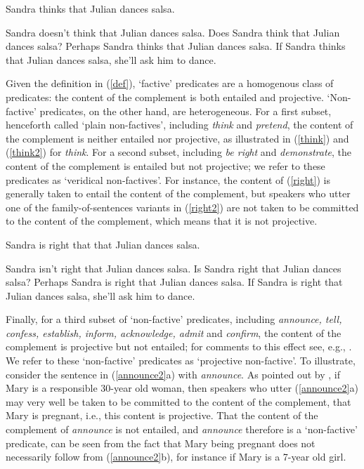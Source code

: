 \documentclass[11pt,fleqn]{article}
\newcommand{\6}{\mbox{$[\hspace*{-.6mm}[$}}
\newcommand{\9}{\mbox{$]\hspace*{-.6mm}]$}}
\begin{document}
\begin{exe}

\ex\label{think} Sandra thinks that Julian dances salsa.
\ex\label{think2} 

\begin{xlist} 
\ex Sandra doesn't think that Julian dances salsa. 
\ex Does Sandra think that Julian dances salsa?
\ex Perhaps Sandra thinks that Julian dances salsa.
\ex If Sandra thinks that Julian dances salsa, she'll ask him to dance. 
\end{xlist}

\end{exe}

Given the definition in (\ref{def}), `factive' predicates are a homogenous class of predicates: the content of the complement is both entailed and projective. `Non-factive' predicates, on the other hand, are heterogeneous. For a first subset, henceforth called `plain non-factives', including {\em think} and {\em pretend}, the content of the complement is neither entailed nor projective, as illustrated in (\ref{think}) and (\ref{think2}) for {\em think}. For a second subset, including {\em be right} and {\em demonstrate}, the content of the complement is entailed but not projective; we refer to these predicates as `veridical non-factives'. For instance, the content of (\ref{right}) is generally taken to entail the content of the complement, but speakers who utter one of the family-of-sentences variants in (\ref{right2}) are not taken to be committed to the content of the complement, which means that it is not projective. 

\begin{exe}
\ex\label{right} Sandra is right that that Julian dances salsa.
\ex\label{right2} 

\begin{xlist} 
\ex Sandra isn't right that Julian dances salsa. 
\ex Is Sandra right that Julian dances salsa?
\ex Perhaps Sandra is right that Julian dances salsa.
\ex If Sandra is right that Julian dances salsa, she'll ask him to dance. 
\end{xlist}
\end{exe}
Finally, for a third subset of `non-factive' predicates, including {\em announce, tell, confess, establish, inform, acknowledge, admit} and {\em confirm}, the content of the complement is projective but not entailed; for comments to this effect see, e.g., \citealt{reis1973,melvold1991,schultz2003,swanson2012,anand-hacquard2014,spector-egre2015,karttunen2016,tbd-variability}.  We refer to these `non-factive' predicates as `projective non-factive'. To illustrate, consider the sentence in (\ref{announce2}a) with {\em announce}. As pointed out by \citet[139]{schlenker10}, if Mary is a responsible 30-year old woman, then speakers who utter (\ref{announce2}a) may very well be taken to be committed to the content of the complement, that Mary is pregnant, i.e., this content is projective. That the content of the complement of {\em announce} is not entailed, and {\em announce} therefore is a `non-factive' predicate, can be seen from the fact that Mary being pregnant does not necessarily follow from (\ref{announce2}b), for instance if Mary is a 7-year old girl.
\end{document}
